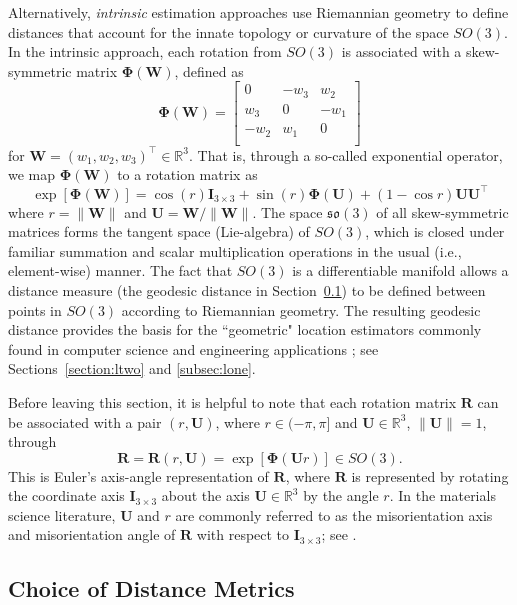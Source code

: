 Alternatively, \textit{intrinsic} estimation approaches use Riemannian geometry to define distances that account for the innate topology or curvature of the space $SO(3)$.  In the intrinsic approach, each rotation from $SO(3)$ is
associated with a skew-symmetric matrix $\bm{\Phi}(\bm{W})$, defined  as
\[
  \bm{\Phi}(\bm{W}) = \left[ \begin{array}{ccc} 0 & -w_3 & w_2\\
  w_3 & 0 & -w_1\\
 - w_2 & w_1 & 0\\
  \end{array}
 \right]
\]
for $\bm{W}=(w_1, w_2, w_3)^\top \in \mathbb{R}^3$. That is, through a so-called exponential operator,
we map  $\bm{\Phi}(\bm{W})$ to a rotation matrix as
\[
  \exp[\bm{\Phi}(\bm{W})] = \cos(r)\bm{I}_{3\times3} + \sin(r) \bm{\Phi}(\bm{U}) + (1-\cos r) \bm{U} \bm{U}^\top
\]
where $r=\|\bm{W}\|$ and $\bm{U} =\bm{W}/\|\bm{W}\| $.  The space $\mathfrak{so}(3)$ of all skew-symmetric matrices forms the tangent space (Lie-algebra) of $SO(3)$, which is closed under familiar summation and scalar multiplication operations in the usual (i.e., element-wise) manner. The fact that $SO(3)$ is a differentiable manifold allows a distance measure (the geodesic distance in Section~\ref{subsec:metrics}) to be defined between points in $SO(3)$ according to Riemannian geometry. The resulting geodesic distance provides the basis for the ``geometric" location estimators commonly found in computer science \citep{fletcher08, fletcher09, hartley11} and engineering applications \citep{manton04}; see Sections~\ref{section:ltwo} and \ref{subsec:lone}.

Before leaving this section, it is helpful to note that each rotation matrix $\bm{R}$ can be associated with a
pair $(r,\bm{U})$, where $r\in(-\pi,\pi]$ and $\bm{U}\in\mathbb{R}^3$, $\|\bm{U}\|=1$, through
\begin{equation}
\label{eqn:angleaxis}
 \bm{R} = \bm{R}(r,\bm{U}) = \exp[\bm\Phi(\bm{U} r)] \in SO(3).
\end{equation}
This is Euler's axis-angle representation of $\bm{R}$, where $\bm{R}$ is represented by rotating the coordinate axis $\bm{I}_{3 \times 3}$ about the axis $\bm{U}\in\mathbb{R}^3$ by the angle $r$. In the materials science literature,
$\bm{U}$ and $r$ are commonly referred to as the misorientation axis and misorientation angle of $\bm R$ with respect to  $\bm{I}_{3 \times 3}$; see \cite{randle03}.


\subsection{Choice of Distance Metrics}\label{subsec:metrics}

